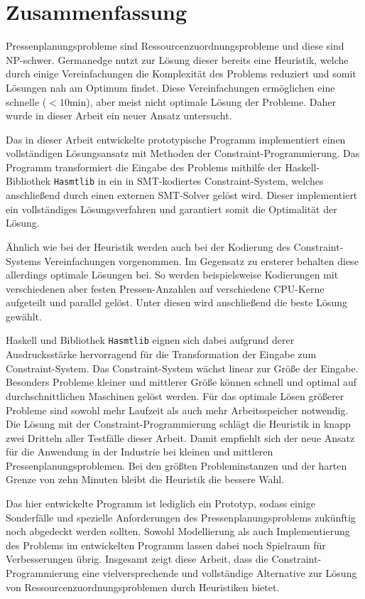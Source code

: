 \chapter{Zusammenfassung}
\label{chapter:zusammenfassung}
Pressenplanungsprobleme sind Ressourcenzuordnungsprobleme und diese sind NP-schwer.
Germanedge nutzt zur Lösung dieser bereits eine Heuristik, welche durch einige Vereinfachungen die Komplexität des Problems reduziert und somit
Lösungen nah am Optimum findet.
Diese Vereinfachungen ermöglichen eine schnelle ($< 10 \text{min}$), aber meist nicht optimale Lösung der Probleme.
Daher wurde in dieser Arbeit ein neuer Ansatz untersucht.

Das in dieser Arbeit entwickelte prototypische Programm implementiert einen vollständigen Lösungsansatz mit Methoden der Constraint-Programmierung.
Das Programm transformiert die Eingabe des Problems mithilfe der Haskell-Bibliothek \texttt{Hasmtlib} in ein in SMT-kodiertes Constraint-System,
welches anschließend durch einen externen SMT-Solver gelöst wird.
Dieser implementiert ein vollständiges Lösungsverfahren und garantiert somit die Optimalität der Lösung.

Ähnlich wie bei der Heuristik werden auch bei der Kodierung des Constraint-Systems Vereinfachungen vorgenommen.
Im Gegensatz zu ersterer behalten diese allerdings optimale Lösungen bei.
So werden beispielsweise Kodierungen mit verschiedenen aber festen Pressen-Anzahlen auf verschiedene CPU-Kerne aufgeteilt und parallel gelöst.
Unter diesen wird anschließend die beste Lösung gewählt.

Haskell und Bibliothek \texttt{Hasmtlib} eignen sich dabei aufgrund derer Ausdrucksstärke hervorragend für die Transformation der Eingabe zum Constraint-System.
Das Constraint-System wächst linear zur Größe der Eingabe.
Besonders Probleme kleiner und mittlerer Größe können schnell und optimal auf durchschnittlichen Maschinen gelöst werden.
Für das optimale Lösen größerer Probleme sind sowohl mehr Laufzeit als auch mehr Arbeitsspeicher notwendig.
Die Lösung mit der Constraint-Programmierung schlägt die Heuristik in knapp zwei Dritteln aller Testfälle dieser Arbeit.
Damit empfiehlt sich der neue Ansatz für die Anwendung in der Industrie bei kleinen und mittleren Pressenplanungsproblemen.
Bei den größten Probleminstanzen und der harten Grenze von zehn Minuten bleibt die Heuristik die bessere Wahl.

Das hier entwickelte Programm ist lediglich ein Prototyp, sodass einige Sonderfälle und spezielle Anforderungen
des Pressenplanungsproblems zukünftig noch abgedeckt werden sollten.
Sowohl Modellierung als auch Implementierung des Problems im entwickelten Programm lassen dabei noch Spielraum für Verbesserungen übrig.
Insgesamt zeigt diese Arbeit, dass die Constraint-Programmierung eine vielversprechende und vollständige
Alternative zur Lösung von Ressourcenzuordnungsproblemen durch Heuristiken bietet.
